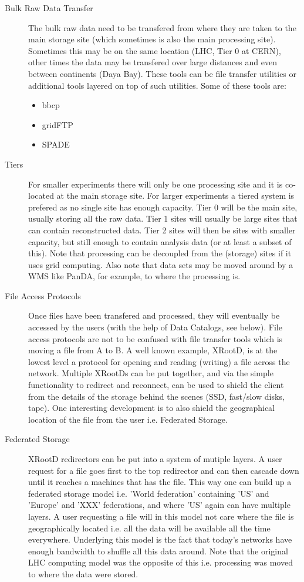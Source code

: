 \begin{description}
\item[Bulk Raw Data Transfer] The bulk raw data need to be transfered from where they are taken to the main storage site (which sometimes is also the 
main processing site). Sometimes this may be on the same location (LHC, Tier 0 at CERN), other times the data may be transfered over large 
distances and even between continents (Daya Bay). These tools can be file transfer utilities or additional tools layered on top of such utilities. 
Some of these tools are:  
\begin{itemize}
\item bbcp 
\item gridFTP
\item SPADE 
\end{itemize}

\item[Tiers] For smaller experiments there will only be one processing site and it is co-located at the main storage site. For larger experiments 
a tiered system is prefered as no single site has enough capacity. Tier 0 will be the main site, usually storing all the raw data. Tier 1 sites will 
usually be large sites that can contain reconstructed data. Tier 2 sites will then be sites with smaller capacity, but still enough to contain 
analysis data (or at least a subset of this). Note that processing can be decoupled from the (storage) sites if it uses grid computing. Also note 
that data sets may be moved around by a WMS like PanDA, for example, to where the processing is.  

\item[File Access Protocols] Once files have been transfered and processed, they will eventually be accessed by the users (with the help of 
Data Catalogs, see below). File access protocols are not to be confused with file transfer tools which is moving a file from A to B. 
A well known example, XRootD, is at the lowest level a protocol for opening and reading (writing) a file across the network. Multiple XRootDs can 
be put together, and via the simple functionality to redirect and reconnect, can be used to shield the client from the details of the storage 
behind the scenes (SSD, fast/slow disks, tape). One interesting development is to also shield the geographical location of the file from the user i.e. 
Federated Storage.

\item[Federated Storage] XRootD redirectors can be put into a system of mutiple layers. A user request for a file goes first to the top 
redirector and can then cascade down until it reaches a machines that has the file. This way one can build up a federated storage model i.e. 
'World federation' containing 'US' and 'Europe' and 'XXX' federations, and where 'US' again can have multiple layers. A user requesting a file 
will in this model not care where the file is geographically located i.e. all the data will be available all the time everywhere. Underlying this 
model is the fact that today's networks have enough bandwidth to shuffle all this data around. 
Note that the original LHC computing model was the opposite of this i.e. processing was moved to where the data were stored.
\end{description}


